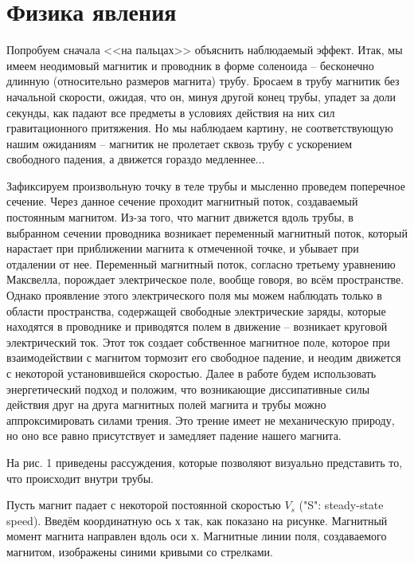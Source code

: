 \documentclass[a4paper,12pt]{article} %
\begin{document}
\section{Физика явления}

Попробуем сначала <<на пальцах>> объяснить наблюдаемый эффект. Итак, мы имеем неодимовый магнитик и проводник в форме соленоида -- бесконечно длинную (относительно размеров магнита) трубу. Бросаем в трубу магнитик без начальной скорости, ожидая, что он, минуя другой конец трубы, упадет за доли секунды, как падают все предметы в условиях действия на них сил гравитационного притяжения. Но мы наблюдаем картину, не соответствующую нашим ожиданиям -- магнитик не пролетает сквозь трубу с ускорением свободного падения, а движется гораздо медленнее...

Зафиксируем произвольную точку в теле трубы и мысленно проведем поперечное сечение. Через данное сечение проходит магнитный поток, создаваемый постоянным магнитом. Из-за того, что магнит движется вдоль трубы, в выбранном сечении проводника возникает переменный магнитный поток, который нарастает при приближении магнита к отмеченной точке, и убывает при отдалении от нее. Переменный магнитный поток, согласно третьему уравнению Максвелла, порождает электрическое поле, вообще говоря, во всём пространстве. Однако проявление этого электрического поля мы можем наблюдать только в области пространства, содержащей свободные электрические заряды, которые находятся в проводнике и приводятся полем в движение -- возникает круговой электрический ток. Этот ток создает собственное магнитное поле, которое при взаимодействии с магнитом тормозит его свободное падение, и неодим движется с некоторой установившейся скоростью. Далее в работе будем использовать энергетический подход и положим, что возникающие диссипативные силы действия друг на друга магнитных полей магнита и трубы можно аппроксимировать силами трения. Это трение имеет не механическую природу, но оно все равно присутствует и замедляет падение нашего магнита.

На рис. 1 приведены рассуждения, которые позволяют визуально представить то, что происходит внутри трубы.

Пусть магнит падает с некоторой постоянной скоростью $V_s$ ("S": steady-state speed). Введём координатную ось х так, как показано на рисунке. Магнитный момент магнита направлен вдоль оси х. Магнитные линии поля, создаваемого магнитом, изображены синими кривыми со стрелками.
\end{document}
